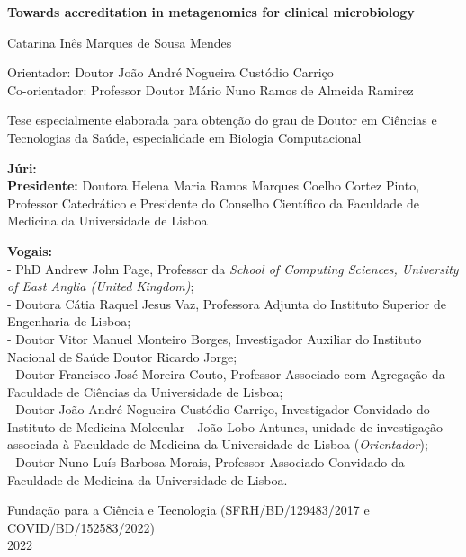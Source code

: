 \begin{titlepage}
\begin{center}
        \vspace{0cm}

        \large
        \textbf{Towards accreditation in metagenomics for clinical microbiology}
        \normalsize
        
        \vspace{0.1cm}
        
        \large
        Catarina Inês Marques de Sousa Mendes
        \normalsize
        
        \vspace{0.1cm}
        
        Orientador: Doutor João André Nogueira Custódio Carriço\\
        Co-orientador: Professor Doutor Mário Nuno Ramos de Almeida Ramirez
        
        \vspace{0.1cm}
        
        Tese especialmente elaborada para obtenção do grau de Doutor em Ciências e Tecnologias da Saúde, especialidade em Biologia Computacional\\


        \end{center}
        \vspace{0cm}

        \small
        \textbf{Júri:}\\
        \textbf{Presidente:} Doutora Helena Maria Ramos Marques Coelho Cortez Pinto, Professor Catedrático e Presidente do Conselho Científico da Faculdade de Medicina da Universidade de Lisboa

        \textbf{Vogais:} \\
        - PhD Andrew John Page, Professor da \textit{School of Computing Sciences, University of East Anglia (United Kingdom)}; \\
        - Doutora Cátia Raquel Jesus Vaz, Professora Adjunta do Instituto Superior de Engenharia de Lisboa; \\
        - Doutor Vitor Manuel Monteiro Borges, Investigador Auxiliar do Instituto Nacional de Saúde Doutor Ricardo Jorge; \\
        - Doutor Francisco José Moreira Couto, Professor Associado com Agregação da Faculdade de Ciências da Universidade de Lisboa; \\
        - Doutor João André Nogueira Custódio Carriço, Investigador Convidado do Instituto de Medicina Molecular - João Lobo Antunes, unidade de investigação associada à Faculdade de Medicina da Universidade de Lisboa (\textit{Orientador}); \\
        - Doutor Nuno Luís Barbosa Morais, Professor Associado Convidado da Faculdade de Medicina da Universidade de Lisboa.
    \begin{center}
        \normalsize
        Fundação para a Ciência e Tecnologia (SFRH/BD/129483/2017 e COVID/BD/152583/2022)\\        
        2022
    \end{center}
\end{titlepage}